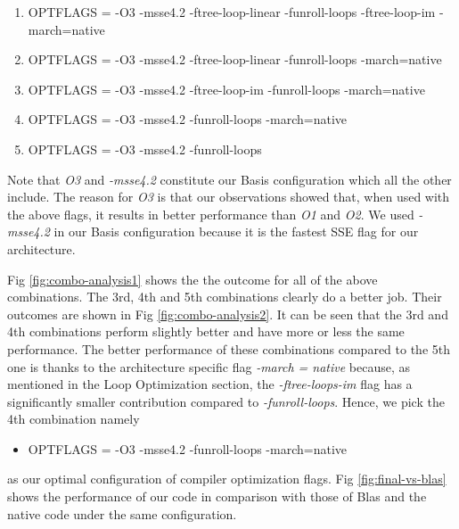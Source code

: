 \documentclass{article}
\begin{document}
\begin{enumerate}

\item OPTFLAGS = -O3 -msse4.2 -ftree-loop-linear -funroll-loops -ftree-loop-im -march=native

\item OPTFLAGS = -O3 -msse4.2 -ftree-loop-linear -funroll-loops -march=native

\item OPTFLAGS = -O3 -msse4.2 -ftree-loop-im -funroll-loops -march=native

\item OPTFLAGS = -O3 -msse4.2 -funroll-loops -march=native

\item OPTFLAGS = -O3 -msse4.2 -funroll-loops

\end{enumerate}

Note that \textit{O3} and \textit{-msse4.2} constitute our Basis configuration which all the other include. The reason for \textit{O3} is that our observations showed that, when used with the above flags, it results in better performance than \textit{O1} and \textit{O2}. We used \textit{-msse4.2} in our Basis configuration because it is the fastest SSE flag for our architecture. 

 
Fig \ref{fig:combo-analysis1} shows the the outcome for all of the above combinations. The 3rd, 4th and 5th combinations clearly do a better job. Their outcomes are shown in Fig \ref{fig:combo-analysis2}. It can be seen that the 3rd  and 4th combinations perform slightly better and have more or less the same performance. The better performance of these combinations compared to the 5th one is thanks to the architecture specific flag \textit{-march = native} because, as mentioned in the Loop Optimization section, the \textit{-ftree-loops-im} flag has a significantly smaller contribution compared to \textit{-funroll-loops}. Hence, we pick the 4th combination namely

\begin{itemize}

\item OPTFLAGS = -O3 -msse4.2 -funroll-loops -march=native

\end{itemize}

as our optimal configuration of compiler optimization flags. Fig \ref{fig:final-vs-blas} shows the performance of our code in comparison with those of Blas and the native code under the same configuration.
 
\end{document}
